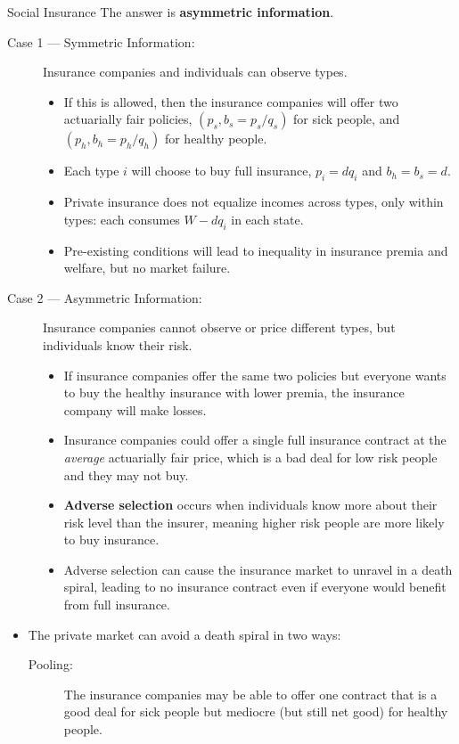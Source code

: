 \documentclass[8pt]{extarticle}
\begin{document}
\begin{problem}{Social Insurance}
    The answer is \textbf{asymmetric information}.
    \begin{description}
      \item[Case 1 --- Symmetric Information:] Insurance companies and individuals can observe types.
        \begin{itemize}
          \item If this is allowed, then the insurance companies will offer two actuarially fair policies, $(p_s, b_s = p_s/q_s)$ for sick people, and $(p_h, b_h = p_h/q_h)$ for healthy people.
          \item Each type $i$ will choose to buy full insurance, $p_i = dq_i$ and $b_h = b_s = d$.
          \item Private insurance does not equalize incomes across types, only within types: each consumes $W - dq_i$ in each state.
          \item Pre-existing conditions will lead to inequality in insurance premia and welfare, but no market failure.
        \end{itemize}
      \item[Case 2 --- Asymmetric Information:] Insurance companies cannot observe or price different types, but individuals know their risk.
        \begin{itemize}
          \item If insurance companies offer the same two policies but everyone wants to buy the healthy insurance with lower premia, the insurance company will make losses.
          \item Insurance companies could offer a single full insurance contract at the \textit{average} actuarially fair price, which is a bad deal for low risk people and they may not buy.
          \item \textbf{Adverse selection} occurs when individuals know more about their risk level than the insurer, meaning higher risk people are more likely to buy insurance.
          \item Adverse selection can cause the insurance market to unravel in a death spiral, leading to no insurance contract even if everyone would benefit from full insurance.
        \end{itemize}
    \end{description}
    \begin{itemize}
      \item The private market can avoid a death spiral in two ways:
        \begin{description}
          \item[Pooling:] The insurance companies may be able to offer one contract that is a good deal for sick people but mediocre (but still net good) for healthy people.

\end{description}
\end{itemize}
\end{problem}
\end{document}
